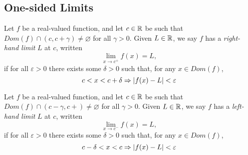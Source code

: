 \subsection{One-sided Limits}
\begin{defi} Let $f$ be a real-valued function, and let $c \in
     \mathbb{R}$ be such that $Dom(f) \cap (c,c+\gamma)\neq \varnothing$ for all
     $\gamma>0$. Given $L \in \mathbb{R}$, we say $f$ has a \emph{right-hand limit} $L$
     at $c$, written
     \begin{equation*}
         \lim \limits_{x \to c^+} f(x) = L,
     \end{equation*}
     if for all $\varepsilon>0$ there exists some $\delta>0$ such that, for any
     $x \in Dom(f)$,
     \begin{equation*}
         c<x<c+\delta \Rightarrow \left\lvert f(x)-L\right\rvert<\varepsilon
     \end{equation*}
\end{defi}
\begin{defi} Let $f$ be a real-valued function, and let $c \in
    \mathbb{R}$ be such that $Dom(f) \cap (c-\gamma,c+)\neq \varnothing$ for all
    $\gamma>0$. Given $L \in \mathbb{R}$, we say $f$ has a \emph{left-hand limit} $L$
    at $c$, written
    \begin{equation*}
        \lim \limits_{x \to c^-} f(x) = L,
    \end{equation*}
    if for all $\varepsilon>0$ there exists some $\delta>0$ such that, for any
    $x \in Dom(f)$,
    \begin{equation*}
        c-\delta<x<c \Rightarrow \left\lvert f(x)-L\right\rvert<\varepsilon
    \end{equation*}
\end{defi}
\newpage
